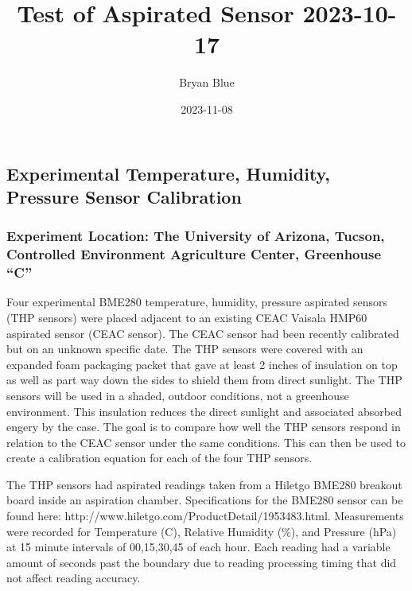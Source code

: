 \documentclass[
  letterpaper,
  DIV=11,
  numbers=noendperiod]{scrartcl}
\title{Test of Aspirated Sensor 2023-10-17}
\author{Bryan Blue}
\date{2023-11-08}
\begin{document}
\maketitle
\ifdefined\Shaded\renewenvironment{Shaded}{\begin{tcolorbox}[enhanced, boxrule=0pt, frame hidden, breakable, interior hidden, borderline west={3pt}{0pt}{shadecolor}, sharp corners]}{\end{tcolorbox}}\fi

\hypertarget{experimental-temperature-humidity-pressure-sensor-calibration}{%
\subsection{Experimental Temperature, Humidity, Pressure Sensor
Calibration}\label{experimental-temperature-humidity-pressure-sensor-calibration}}

\hypertarget{experiment-location-the-university-of-arizona-tucson-controlled-environment-agriculture-center-greenhouse-c}{%
\subsubsection{Experiment Location: The University of Arizona, Tucson,
Controlled Environment Agriculture Center, Greenhouse
``C''}\label{experiment-location-the-university-of-arizona-tucson-controlled-environment-agriculture-center-greenhouse-c}}

Four experimental BME280 temperature, humidity, pressure aspirated
sensors (THP sensors) were placed adjacent to an existing CEAC Vaisala
HMP60 aspirated sensor (CEAC sensor). The CEAC sensor had been recently
calibrated but on an unknown specific date. The THP sensors were covered
with an expanded foam packaging packet that gave at least 2 inches of
insulation on top as well as part way down the sides to shield them from
direct sunlight. The THP sensors will be used in a shaded, outdoor
conditions, not a greenhouse environment. This insulation reduces the
direct sunlight and associated absorbed engery by the case. The goal is
to compare how well the THP sensors respond in relation to the CEAC
sensor under the same conditions. This can then be used to create a
calibration equation for each of the four THP sensors.

The THP sensors had aspirated readings taken from a Hiletgo BME280
breakout board inside an aspiration chamber. Specifications for the
BME280 sensor can be found here:
http://www.hiletgo.com/ProductDetail/1953483.html. Measurements were
recorded for Temperature (C), Relative Humidity (\%), and Pressure (hPa)
at 15 minute intervals of 00,15,30,45 of each hour. Each reading had a
variable amount of seconds past the boundary due to reading processing
timing that did not affect reading accuracy.
\end{document}
